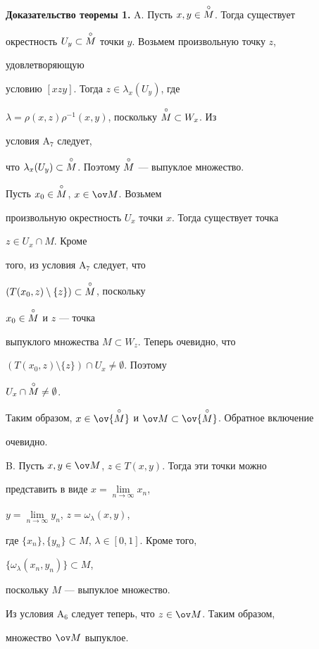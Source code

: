 


{\bf Доказательство теоремы 1.} A. Пусть $x,y\in\overset{\circ}{M}{}$. Тогда существует 


окрестность $U_y\subset\overset{\circ}{M}{}$ точки $y$. Возьмем произвольную точку $z$, 


удовлетворяющую 


условию $[xzy]$. Тогда $z\in\lambda_x(U_y)$, где 


$\lambda=\rho(x,z)\rho^{-1}(x,y)$, поскольку $\overset{\circ}{M}{}\subset W_x$. Из 


условия A${}_7$ следует, 


что $\lambda_x(U_y)\subset\overset{\circ}{M}{}$. Поэтому $\overset{\circ}{M}{}$ --- выпуклое множество. 


Пусть $x_0\in\overset{\circ}{M}{}$, $x\in\ov M$. Возьмем 


произвольную окрестность $U_x$ точки $x$. Тогда существует точка 


$z\in U_x\cap M$. Кроме 


того, из условия A${}_7$ следует, что 


$(T(x_0,z)\setminus\{z\})\subset\overset{\circ}{M}{}$, поскольку 


$x_0\in\overset{\circ}{M}{}$ и $z$ --- точка 


выпуклого множества $M\subset W_z$. Теперь очевидно, что 


$(T(x_0,z)\setminus\{z\})\cap U_x\ne\emptyset$. Поэтому 


$U_x\cap\overset{\circ}{M}{}\ne\emptyset$. 


Таким образом, $x\in\ov{\cM}$ и $\ov M\subset\ov{\cM}$. Обратное включение 


очевидно. 


\medskip 


 


B. Пусть $x,y\in\ov M$, $z\in T(x,y)$. Тогда эти точки можно 


представить в виде $x=\lim\limits_{n\to\infty}x_n$, 


$y=\lim\limits_{n\to\infty}y_n$, $z=\omega_\lambda(x,y)$, 


где $\{x_n\},\{y_n\}\subset M$, $\lambda\in[0,1]$. Кроме того, 


$\{\omega_\lambda(x_n,y_n)\}\subset M$, 


поскольку $M$ --- выпуклое множество. 


Из условия A${}_6$ следует теперь, что $z\in\ov M$. Таким образом, 


множество $\ov M$ выпуклое. 


\medskip 


